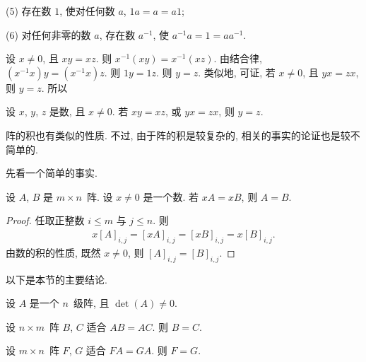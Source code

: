 \documentclass[../libro.tex]{subfiles}
\begin{document}
(5)
存在数 \(1\), 使对任何数 \(a\), \(1a = a = a1\);

(6)
对任何非零的数 \(a\), 存在数 \(a^{-1}\), 使 \(a^{-1} a = 1 = a a^{-1}\).

设 \(x \neq 0\), 且 \(xy = xz\).
则 \(x^{-1} (xy) = x^{-1} (xz)\).
由结合律, \((x^{-1} x) y = (x^{-1} x) z\).
则 \(1y = 1z\).
则 \(y = z\).
类似地, 可证,
若 \(x \neq 0\), 且 \(yx = zx\), 则 \(y = z\).
所以

\begin{theorem}
    设 \(x\), \(y\), \(z\) 是数, 且 \(x \neq 0\).
    若 \(xy = xz\), 或 \(yx = zx\), 则 \(y = z\).
\end{theorem}

阵的积也有类似的性质.
不过, 由于阵的积是较复杂的, 相关的事实的论证也是较不简单的.

先看一个简单的事实.

\begin{theorem}
    设 \(A\), \(B\) 是 \(m \times n\)~阵.
    设 \(x \neq 0\) 是一个数.
    若 \(xA = xB\), 则 \(A = B\).
\end{theorem}

\begin{proof}
    任取正整数 \(i \leq m\) 与 \(j \leq n\).
    则
    \begin{align*}
        x [A]_{i,j} = [xA]_{i,j} = [xB]_{i,j} = x [B]_{i,j}.
    \end{align*}
    由数的积的性质, 既然 \(x \neq 0\),
    则 \([A]_{i,j} = [B]_{i,j}\).
\end{proof}

以下是本节的主要结论.

\begin{theorem}
    设 \(A\) 是一个 \(n\)~级阵, 且 \(\det {(A)} \neq 0\).

    设 \(n \times m\)~阵 \(B\), \(C\) 适合 \(AB = AC\).
    则 \(B = C\).

    设 \(m \times n\)~阵 \(F\), \(G\) 适合 \(FA = GA\).
    则 \(F = G\).
\end{theorem}
\end{document}
